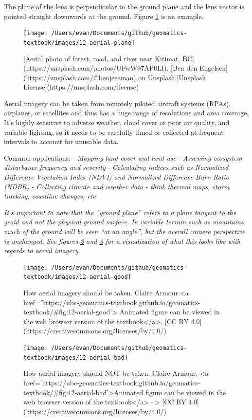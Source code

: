 \documentclass[
]{book}
\begin{document}
The plane of the lens is perpendicular to the ground plane and the lens vector is pointed straight downwards at the ground. Figure \ref{fig:12-aerial-plane} is an example.

\begin{figure}
\texttt{[image: /Users/evan/Documents/github/geomatics-textbook/images/12-aerial-plane]} \caption{[Aerial photo of forest, road, and river near Kitimat, BC](https://unsplash.com/photos/UFwW97AP0LI). [Ben den Engelsen](https://unsplash.com/@benjeeeman) on Unsplash.[Unsplash License](https://unsplash.com/license)}\label{fig:12-aerial-plane}
\end{figure}

Aerial imagery can be taken from remotely piloted aircraft systems (RPAs), airplanes, or satellites and thus has a huge range of resolutions and area coverage. It's highly sensitive to adverse weather, cloud cover or poor air quality, and variable lighting, so it needs to be carefully timed or collected at frequent intervals to account for unusable data.

Common applications:
- \emph{Mapping land cover and land use}
- \emph{Assessing ecosystem disturbance frequency and severity}
- \emph{Calculating indices such as Normalized Difference Vegetation Index (NDVI) and Normalized Difference Burn Ratio (NDBR)}
- \emph{Collecting climate and weather data - think thermal maps, storm tracking, coastline changes, etc}

\emph{It's important to note that the ``ground plane'' refers to a plane tangent to the geoid and not the physical ground surface. In variable terrain such as mountains, much of the ground will be seen ``at an angle'', but the overall camera perspective is unchanged. See figures \ref{fig:12-aerial-good} and \ref{fig:12-aerial-bad} for a visualization of what this looks like with regards to aerial imagery.}

\begin{figure}
\texttt{[image: /Users/evan/Documents/github/geomatics-textbook/images/12-aerial-good]} \caption{How aerial imagery should be taken. Claire Armour.<a href='https://ubc-geomatics-textbook.github.io/geomatics-textbook/#fig:12-aerial-good'> Animated figure can be viewed in the web browser version of the textbook</a>. [CC BY 4.0](https://creativecommons.org/licenses/by/4.0/)}\label{fig:12-aerial-good}
\end{figure}

\begin{figure}
\texttt{[image: /Users/evan/Documents/github/geomatics-textbook/images/12-aerial-bad]} \caption{How aerial imagery should NOT be taken. Claire Armour.  <a href='https://ubc-geomatics-textbook.github.io/geomatics-textbook/#fig:12-aerial-bad'>Animated figure can be viewed in the web browser version of the textbook</a> --> [CC BY 4.0](https://creativecommons.org/licenses/by/4.0/)}\label{fig:12-aerial-bad}
\end{figure}
\end{document}
